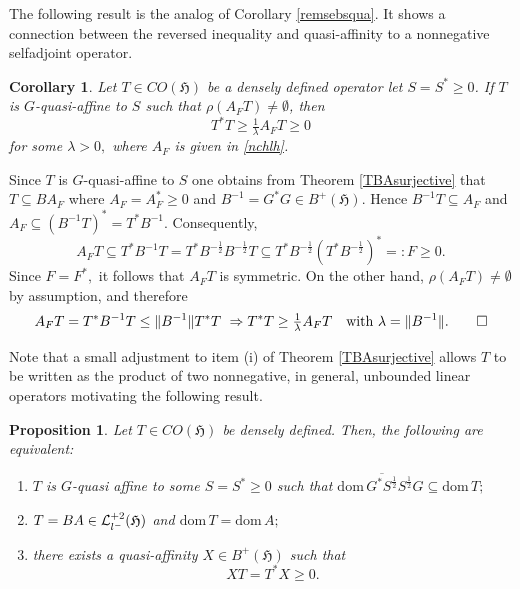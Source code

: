 \documentclass{amsart}
\makeatletter
\newtheorem{proposition}[theorem]{Proposition}
\newtheorem{corollary}[theorem]{Corollary}
\newcommand{\n}{\|}
\newcommand{\vide}{\emptyset}
\newcommand{\h}{\mathfrak{H}}
\newcommand{\D}{\mathrm{dom}\,}
\newcommand{\DT}{\mathrm{dom}\,T }
\newcommand{\DA}{\mathrm{dom}  \,A }
\newcommand{\adj}{^*}
\newcommand{\inv}{^{-1}}
\newcommand{\tstar}{T^{*}}
\newcommand{\half}{^{\frac{1}{2}}}
\newcommand{\mhalf}{^{-\frac{1}{2}}}
\newcommand{\inclu}{\subseteq}
\newcommand{\lplus}{B^{+}(\h)}
\newcommand{\lldeux}{\mathcal{L}_{{l}^{\tiny-}}^{+2}(\h)}
\numberwithin{equation}{section}
\renewenvironment{proof}[1][\proofname]{%
   \par\pushQED{\qed}\normalfont%
   \topsep6\p@\@plus6\p@\relax
   \trivlist\item[\hskip\labelsep\bfseries#1\@addpunct{.}]%
   \ignorespaces
}{%
   \popQED\endtrivlist\@endpefalse
}
\renewcommand{\labelenumi}{(\arabic{enumi})}
\makeatother
\begin{document}
The following result is the analog of Corollary \ref{remsebsqua}. It shows a connection between the  reversed  inequality and quasi-affinity to a nonnegative selfadjoint operator.

\begin{corollary}\label{revsebquasiaff}
Let $T \in CO(\h)$ be a densely defined operator   let $S=S\adj \geq 0 $. If $T$ is $G$-quasi-affine to $S$  such that $\rho(A_F T) \neq \vide$,  then
 $$ T^* T  \geq  \tfrac{1}{\lambda}  A_F T \geq 0 $$
for some $\lambda >0,$ where $A_F$ is given in \eqref{nchlh}.
\end{corollary}

\begin{proof}
Since $T$ is $G$-quasi-affine to $S$ one obtains from  Theorem  \ref{TBAsurjective} that $T \inclu BA_F$ where  $A_F = A_F\adj \geq 0$ and $B \inv =  G\adj G \in \lplus. $   Hence $B\inv T \inclu A_F$ and $A_F \inclu  (B\inv T)\adj =\tstar B\inv.$ Consequently,
$$
A_FT \inclu  \tstar B\inv  T =\tstar B\mhalf B\mhalf T \inclu \tstar B\mhalf (\tstar B\mhalf)\adj= :F \geq 0.
$$
Since $F= F\adj,$ it follows that  $A_FT$ is symmetric. On the other hand, $\rho(A_FT)  \neq \vide$ by assumption, and therefore
\[
 A_FT = \tstar B\inv T \leq \n B\inv \n  \tstar T \ \Rightarrow \tstar T \geq \tfrac{1}{\lambda}   A_FT \quad 
\text{with } \lambda =  \n B\inv \n. \qedhere
\]
\end{proof}

Note that a small adjustment to item (i) of Theorem \ref{TBAsurjective} allows
$T$ to be written as the product of two nonnegative, in general, unbounded  linear operators  motivating the following result.

\begin{proposition}\label{cond1equiv}
  Let $T\in CO(\h) $ be densely defined. Then, the following are equivalent:
   \begin{enumerate}\def\labelenumi{\rm(\roman{enumi})}
       \item   $T$ is  $G$-quasi affine to some $S=S\adj \geq 0$ such that $ \D \overline{G\adj S\half} S\half G \inclu \DT;$
       \item $T = B A  \in \lldeux  $ and $ \D T = \DA;$
        \item there exists  a quasi-affinity  $X \in \lplus$ such that
         \begin{equation}\label{103}
          X T = \tstar X \geq 0.
        \end{equation}
   \end{enumerate}
\end{proposition}
\end{document}
